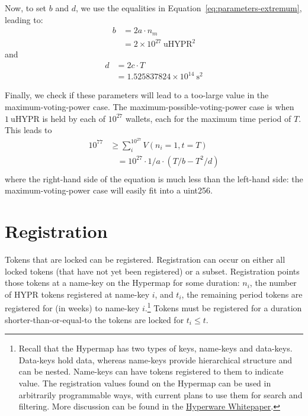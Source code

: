 \documentclass{article}
\begin{document}
Now, to set $b$ and $d$, we use the equalities in Equation~\ref{eq:parameters-extremum}, leading to:
\begin{equation}
\begin{aligned}
b &= 2 a \cdot n_m \\
  &= 2 \times 10^{27}~\text{uHYPR}^2
\end{aligned}
\end{equation}
and
\begin{equation}
\begin{aligned}
d &= 2 c \cdot T \\
  &= 1.525837824 \times 10^{14}~\text{s}^2
\end{aligned}
\end{equation}

Finally, we check if these parameters will lead to a too-large value in the maximum-voting-power case.
The maximum-possible-voting-power case is when $1~\text{uHYPR}$ is held by each of $10^{27}$ wallets, each for the maximum time period of $T$.
This leads to
\begin{equation}
\begin{aligned}
10^{77} & \geq \sum_i^{10^{27}} V(n_i = 1, t = T) \\
	&~~~~= 10^{27} \cdot 1/a \cdot (T/b - T^2/d) \\
\end{aligned}
\end{equation}
where the right-hand side of the equation is much less than the left-hand side: the maximum-voting-power case will easily fit into a uint256.

\section{Registration}\label{sec:registration}

Tokens that are locked can be registered.
Registration can occur on either all locked tokens (that have not yet been registered) or a subset.
Registration points those tokens at a name-key on the Hypermap for some duration: $n_i$, the number of HYPR tokens registered at name-key $i$, and $t_i$, the remaining period tokens are registered for (in weeks) to name-key $i$.\footnote{
	Recall that the Hypermap has two types of keys, name-keys and data-keys.
	Data-keys hold data, whereas name-keys provide hierarchical structure and can be nested.
	Name-keys can have tokens registered to them to indicate value.
	The registration values found on the Hypermap can be used in arbitrarily programmable ways, with current plans to use them for search and filtering.
	More discussion can be found in the \href{https://hyperware.ai/whitepaper.pdf}{Hyperware Whitepaper}.
}
Tokens must be registered for a duration shorter-than-or-equal-to the tokens are locked for $t_i \leq t$.
\end{document}
